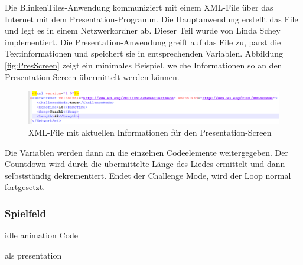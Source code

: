 Die BlinkenTiles-Anwendung kommuniziert mit einem XML-File über das Internet mit dem Presentation-Programm. Die Hauptanwendung erstellt das File und legt es in einem Netzwerkordner ab. Dieser Teil wurde von Linda Schey implementiert. Die Presentation-Anwendung greift auf das File zu, parst die Textinformationen und speichert sie in entsprechenden Variablen. Abbildung \autoref{fig:PresScreen} zeigt ein minimales Beispiel, welche Informationen so an den Presentation-Screen übermittelt werden können.

\begin{figure}[htbp]
	\centering
		\includegraphics[width=1.0\textwidth]{images/XML.png}
	\caption{XML-File mit aktuellen Informationen für den Presentation-Screen }
	\label{fig:PresScreen}
\end{figure}

Die Variablen werden dann an die einzelnen Codeelemente weitergegeben. Der Countdown wird durch die übermittelte Länge des Liedes ermittelt und dann selbstständig dekrementiert. Endet der Challenge Mode, wird der Loop normal fortgesetzt.


\subsubsection{Spielfeld}
idle animation
Code

als presentation